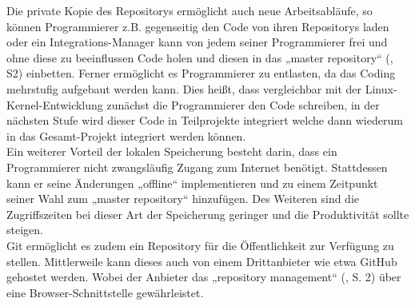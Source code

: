 Die private Kopie des Repositorys ermöglicht auch neue Arbeitsabläufe, so können Programmierer z.B. gegenseitig den Code von ihren Repositorys laden oder ein Integrations-Manager kann von jedem seiner Programmierer frei und ohne diese zu beeinflussen Code holen und diesen in das „master repository“ (\cite{git_tool}, S2) einbetten. Ferner ermöglicht es Programmierer zu entlasten, da das Coding mehrstufig aufgebaut werden kann. Dies heißt, dass vergleichbar mit der Linux-Kernel-Entwicklung zunächst die Programmierer den Code schreiben, in der nächsten Stufe wird dieser Code in Teilprojekte integriert welche dann wiederum in das Gesamt-Projekt integriert werden können.
\\
Ein weiterer Vorteil der lokalen Speicherung besteht darin, dass ein Programmierer nicht zwangsläufig Zugang zum Internet benötigt. Stattdessen kann er seine Änderungen „offline“ implementieren und zu einem Zeitpunkt seiner Wahl zum „master repository“  hinzufügen. Des Weiteren sind die Zugriffszeiten bei dieser Art der Speicherung geringer und die Produktivität sollte steigen.
\\
Git ermöglicht es zudem ein Repository für die Öffentlichkeit zur Verfügung zu stellen. Mittlerweile kann dieses auch von einem Drittanbieter wie etwa GitHub gehostet werden. Wobei der Anbieter das „repository management“ (\cite{git_tool}, S. 2) über eine Browser-Schnittstelle gewährleistet. 
